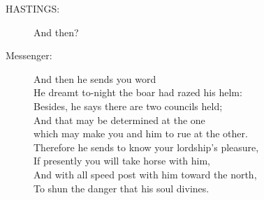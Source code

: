 \documentclass{article}
\begin{document}
\begin{description}
\item[HASTINGS:] 
\hspace{1pt}And then?\\
\end{description}
\begin{description}
\item[Messenger:] 
\hspace{1pt}And then he sends you word\\
\hspace{1pt}He dreamt to-night the boar had razed his helm:\\
\hspace{1pt}Besides, he says there are two councils held;\\
\hspace{1pt}And that may be determined at the one\\
\hspace{1pt}which may make you and him to rue at the other.\\
\hspace{1pt}Therefore he sends to know your lordship's pleasure,\\
\hspace{1pt}If presently you will take horse with him,\\
\hspace{1pt}And with all speed post with him toward the north,\\
\hspace{1pt}To shun the danger that his soul divines.\\
\end{description}
\end{document}
